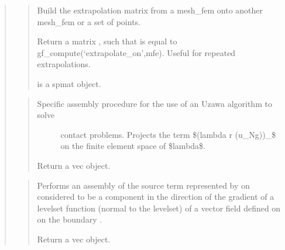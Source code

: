 \documentclass[a4paper,11pt,english]{sphinxmanual}
\begin{document}
\begin{quote}
\sphinxAtStartPar
{}
\begin{quote}

\sphinxAtStartPar
Build the extrapolation matrix from a mesh\_fem onto another mesh\_fem or a set of points.

\sphinxAtStartPar
Return a matrix , such that  is equal to
gf\_compute(‘extrapolate\_on’,mfe). Useful for repeated
extrapolations.

\sphinxAtStartPar
{} is a spmat object.
\end{quote}

\sphinxAtStartPar
{}
\begin{quote}
\begin{description}
\item[{Specific assembly procedure for the use of an Uzawa algorithm to solve}] \leavevmode
\sphinxAtStartPar
contact problems. Projects the term \$\sphinxhyphen{}(lambda \sphinxhyphen{} r (u\_N\sphinxhyphen{}g))\_\sphinxhyphen{}\$ on the
finite element space of \$lambda\$.

\end{description}

\sphinxAtStartPar
Return a vec object.
\end{quote}

\sphinxAtStartPar
{}
\begin{quote}

\sphinxAtStartPar
Performs an assembly of the source term represented by 
on  considered to be a component in the direction of the
gradient of a levelset function (normal to the levelset) of a vector
field defined on  on the boundary .

\sphinxAtStartPar
Return a vec object.
\end{quote}


\end{quote}
\end{document}

